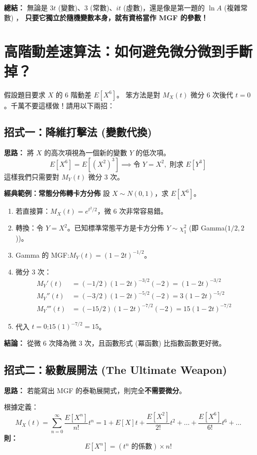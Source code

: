 \documentclass{article}
\begin{document}
\textbf{總結：}
無論是 $3t$ (變數)、$3$ (常數)、$it$ (虛數)，還是像是第一題的 $\ln A$ (複雜常數) ， 
\textbf{只要它獨立於隨機變數本身，就有資格當作 MGF 的參數！}

\section*{高階動差速算法：如何避免微分微到手斷掉？}

假設題目要求 $X$ 的 6 階動差 $E[X^6]$。
笨方法是對 $M_X(t)$ 微分 6 次後代 $t=0$。千萬不要這樣做！請用以下兩招：

\subsection*{招式一：降維打擊法 (變數代換)}
\textbf{思路：} 將 $X$ 的高次項視為一個新的變數 $Y$ 的低次項。
$$ E[X^6] = E[(X^2)^3] \implies \text{令 } Y = X^2, \text{ 則求 } E[Y^3] $$
這樣我們只需要對 $M_Y(t)$ 微分 3 次。

\textbf{經典範例：常態分佈轉卡方分佈}
設 $X \sim N(0, 1)$，求 $E[X^6]$。
\begin{enumerate}
    \item 若直接算：$M_X(t) = e^{t^2/2}$，微 6 次非常容易錯。
    \item 轉換：令 $Y = X^2$。已知標準常態平方是卡方分佈 $Y \sim \chi^2_1$ (即 Gamma($1/2, 2$))。
    \item Gamma 的 MGF:$M_Y(t) = (1 - 2t)^{-1/2}$。
    \item 微分 3 次：
    \begin{align*}
    M_Y'(t) &= (-1/2)(1-2t)^{-3/2}(-2) = (1-2t)^{-3/2} \\
    M_Y''(t) &= (-3/2)(1-2t)^{-5/2}(-2) = 3(1-2t)^{-5/2} \\
    M_Y'''(t) &= (-15/2)(1-2t)^{-7/2}(-2) = 15(1-2t)^{-7/2}
    \end{align*}
    \item 代入 $t=0$:$15(1)^{-7/2} = 15$。
\end{enumerate}
\textbf{結論：} 從微 6 次降為微 3 次，且函數形式 (冪函數) 比指數函數更好微。

\subsection*{招式二：級數展開法 (The Ultimate Weapon)}
\textbf{思路：} 若能寫出 MGF 的泰勒展開式，則完全\textbf{不需要微分}。

根據定義：
$$ M_X(t) = \sum_{n=0}^{\infty} \frac{E[X^n]}{n!} t^n = 1 + E[X]t + \frac{E[X^2]}{2!}t^2 + \dots + \frac{E[X^6]}{6!}t^6 + \dots $$
\textbf{則：}
$$ E[X^n] = (\text{$t^n$ 的係數}) \times n! $$
\end{document}

